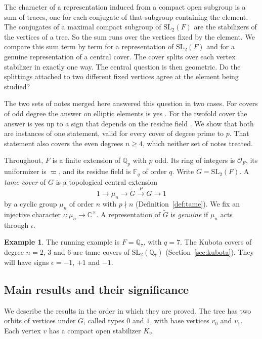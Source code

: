 \documentclass[12pt,letterpaper]{article}
\numberwithin{equation}{section}
\theoremstyle{definition}
\newtheorem{example}[theorem]{Example}
\theoremstyle{remark}
\newcommand{\OO}{\mathcal O_F}
\newcommand{\kk}{\mathbb F_q}
\newcommand{\Gt}{\widetilde G}
\newcommand{\sgn}{\epsilon}
\begin{document}
The character of a representation induced from a compact open subgroup is a sum of traces, one for each conjugate of that subgroup containing the element. The conjugates of a maximal compact subgroup of $\mathrm{SL}_2(F)$ are the stabilizers of the vertices of a tree. So the sum runs over the vertices fixed by the element. We compare this sum term by term for a representation of $\mathrm{SL}_2(F)$ and for a genuine representation of a central cover. The cover splits over each vertex stabilizer in exactly one way. The central question is then geometric. Do the splittings attached to two different fixed vertices agree at the element being studied?

The two sets of notes merged here answered this question in two cases. For covers of odd degree the answer on elliptic elements is yes \cite{Jo26a}. For the twofold cover the answer is yes up to a sign that depends on the residue field \cite{Jo26b}. We show that both are instances of one statement, valid for every cover of degree prime to $p$. That statement also covers the even degrees $n\ge4$, which neither set of notes treated.

Throughout, $F$ is a finite extension of $\mathbb Q_p$ with $p$ odd. Its ring of integers is $\OO$, its uniformizer is $\varpi$, and its residue field is $\kk$ of order $q$. Write $G=\mathrm{SL}_2(F)$. A \emph{tame cover} of $G$ is a topological central extension
\begin{equation}\label{eq:cover}
 1\longrightarrow\mu_n\longrightarrow\Gt\xrightarrow{\ P\ }G\longrightarrow1
\end{equation}
by a cyclic group $\mu_n$ of order $n$ with $p\nmid n$ (Definition~\ref{def:tame}). We fix an injective character $\iota:\mu_n\to\mathbb C^\times$. A representation of $\Gt$ is \emph{genuine} if $\mu_n$ acts through $\iota$.

\begin{example}\label{ex:running}
The running example is $F=\mathbb Q_7$, with $q=7$. The Kubota covers of degree $n=2$, $3$ and $6$ are tame covers of $\mathrm{SL}_2(\mathbb Q_7)$ (Section~\ref{sec:kubota}). They will have signs $\sgn=-1$, $+1$ and $-1$.
\end{example}

\subsection*{Main results and their significance}
We describe the results in the order in which they are proved. The tree has two orbits of vertices under $G$, called types $0$ and $1$, with base vertices $v_0$ and $v_1$. Each vertex $v$ has a compact open stabilizer $K_v$.
\end{document}
